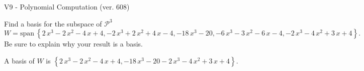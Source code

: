 \begin{exercise}
  \begin{exerciseTitle}V9 - Polynomial Computation (ver. 608)\end{exerciseTitle}
  \begin{exerciseStatement}
    Find a basis for the subspace of \(\mathcal{P}^3\) 
\[W=\mathrm{span}\ \left\{2 \, x^{3} - 2 \, x^{2} - 4 \, x + 4 , -2 \, x^{3} + 2 \, x^{2} + 4 \, x - 4 , -18 \, x^{3} - 20 , -6 \, x^{3} - 3 \, x^{2} - 6 \, x - 4 , -2 \, x^{3} - 4 \, x^{2} + 3 \, x + 4\right\}.\]
 Be sure to explain why your result is a basis.


  \end{exerciseStatement}
  \begin{exerciseAnswer}
   A basis of \(W\) is  \(\left\{2 \, x^{3} - 2 \, x^{2} - 4 \, x + 4 , -18 \, x^{3} - 20 -2 \, x^{3} - 4 \, x^{2} + 3 \, x + 4\right\}\).
  


  \end{exerciseAnswer}
\end{exercise}